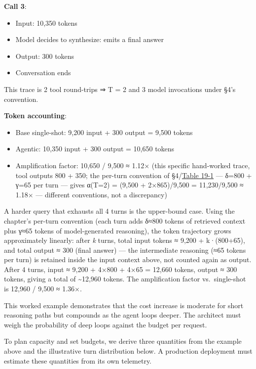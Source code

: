\textbf{Call 3}:

\begin{itemize}
\tightlist
\item
  Input: 10,350 tokens
\item
  Model decides to synthesize: emits a final answer
\item
  Output: 300 tokens
\item
  Conversation ends
\end{itemize}

This trace is 2 tool round-trips ⇒ T = 2 and 3 model invocations under
§4's convention.

\textbf{Token accounting}:

\begin{itemize}
\tightlist
\item
  Base single-shot: 9,200 input + 300 output = 9,500 tokens
\item
  Agentic: 10,350 input + 300 output = 10,650 tokens
\item
  Amplification factor: 10,650 / 9,500 ≈ 1.12× (this specific
  hand-worked trace, tool outputs 800 + 350; the per-turn convention of
  §4/\hyperref[tab:19.1]{Table 19-1} --- δ=800 + γ=65 per turn --- gives α(T=2) = (9,500 +
  2×865)/9,500 = 11,230/9,500 ≈ 1.18× --- different conventions, not a
  discrepancy)
\end{itemize}

A harder query that exhausts all 4 turns is the upper-bound case. Using
the chapter's per-turn convention (each turn adds δ≈800 tokens of
retrieved context plus γ≈65 tokens of model-generated reasoning), the
token trajectory grows approximately linearly: after \emph{k} turns,
total input tokens ≈ 9,200 + k·(800+65), and total output ≈ 300 (final
answer) --- the intermediate reasoning (≈65 tokens per turn) is retained
inside the input context above, not counted again as output. After 4
turns, input ≈ 9,200 + 4×800 + 4×65 = 12,660 tokens, output ≈ 300
tokens, giving a total of \textasciitilde12,960 tokens. The
amplification factor vs.~single-shot is 12,960 / 9,500 ≈ 1.36×.

This worked example demonstrates that the cost increase is moderate for
short reasoning paths but compounds as the agent loops deeper. The
architect must weigh the probability of deep loops against the budget
per request.

\label{measurement}


To plan capacity and set budgets, we derive three quantities from the
example above and the illustrative turn distribution below. A production
deployment must estimate these quantities from its own telemetry.

